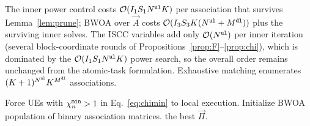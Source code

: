 \documentclass[journal]{IEEEtran}
\begin{document}
The {inner power control} costs $\mathcal{O}(I_1 S_1 N^{\tt ul}K)$ per association that survives Lemma~\ref{lem:prune}; 
BWOA over $\vec{A}$ costs $\mathcal{O}(I_3 S_3 K(N^{\tt ul}+M^{\tt dl}))$ plus the surviving inner solves. The ISCC variables add only $\mathcal{O}(N^{\tt ul})$ per inner iteration (several block-coordinate rounds of Propositions~\ref{prop:F}--\ref{prop:chi}), which is dominated by the $\mathcal{O}(I_1 S_1 N^{\tt ul}K)$ power search, so the overall order remains unchanged from the atomic-task formulation. Exhaustive matching enumerates $(K+1)^{N^{\tt ul}}K^{M^{\tt dl}}$ associations.

{\begin{algorithm}[!t]
\DontPrintSemicolon
{}
Force UEs with $\chi_n^{\tt min}>1$ in Eq.~\eqref{eq:chimin} to local execution.\;
Initialize BWOA population of binary association matrices.\;
\Return the best $\vec{\Pi}$.\;
\caption{Hybrid {WOA/PSO/PGD}--BWOA for SI-TNTN UAV edge-inference ISCC.}
\label{alg:hyb}
\end{algorithm}
}
\end{document}
